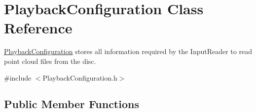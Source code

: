 \hypertarget{class_playback_configuration}{}\section{Playback\+Configuration Class Reference}
\label{class_playback_configuration}


\hyperlink{class_playback_configuration}{Playback\+Configuration} stores all information required by the Input\+Reader to read point cloud files from the disc.  




{\ttfamily \#include $<$Playback\+Configuration.\+h$>$}

\subsection*{Public Member Functions}
